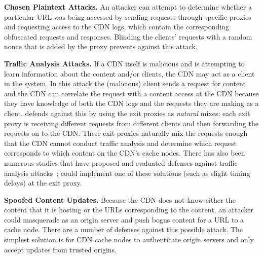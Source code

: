\textbf{Chosen Plaintext Attacks.} An attacker can attempt to
determine whether a particular URL was being accessed by sending requests
through specific \system{} proxies and requesting access to the CDN logs, 
which contain the corresponding obfuscated
requests and responses. Blinding the clients' requests
with a random nonce that is added by the proxy prevents against this
attack. %

\textbf{Traffic Analysis Attacks.} If a CDN itself is malicious and is attempting 
to learn information about the content and/or clients, the CDN may act as a client 
in the system. In this attack the (malicious) client sends a request for content 
and the CDN can correlate the request with a content access at the CDN because they have 
knowledge of both the CDN logs and the requests they are making as a client.  \system{} 
defends against this by using the exit proxies as {\it natural} mixes; each exit proxy is receiving 
different requests from different clients and then forwarding the requests on to the CDN.  
These exit proxies naturally mix the requests enough that the CDN cannot conduct traffic analysis
 and determine which request corresponds to which content on the CDN's cache nodes.
There has also been numerous studies that have proposed and evaluated defenses against traffic analysis attacks~\cite{wright2009traffic,rackoff1993cryptographic}; \system{} could implement one of these solutions (such as slight timing delays) at the exit 
proxy.

\textbf{Spoofed Content Updates.} Because the CDN does not know either the content that it is hosting or the URLs
corresponding to the content, an attacker could masquerade as an origin server
and push bogus content for a URL to a cache node. There are
a number of defenses against this possible attack. The simplest solution is
for CDN cache nodes to authenticate origin servers and only accept updates
from trusted origins.%

